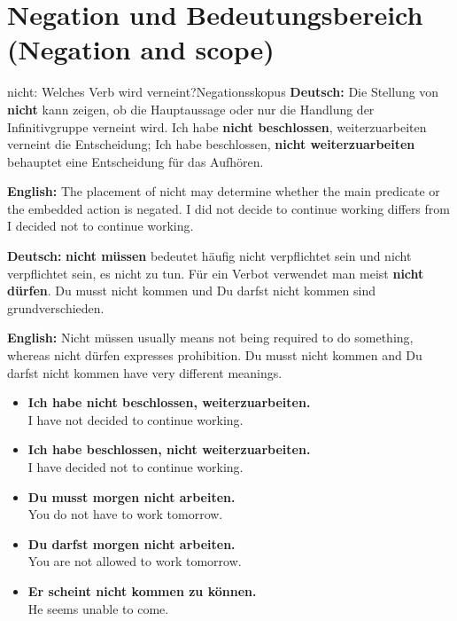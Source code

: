 \documentclass[a4paper,11pt]{article}
\newcommand{\GermanText}[1]{\textbf{Deutsch: }#1\par}
\newcommand{\EnglishText}[1]{{\small\color{SoftGray}\textbf{English: }#1\par}}
\newcommand{\ExampleItem}[2]{\item \textbf{#1}\\{\small\color{SoftGray}#2}}
\newcommand{\DEEN}[2]{\GermanText{#1}\EnglishText{#2}}
\newcommand{\Pair}[2]{\ExampleItem{#1}{#2}}
\begin{document}
\section{Negation und Bedeutungsbereich \textnormal{(Negation and scope)}}
\begin{grammarentry}{nicht: Welches Verb wird verneint?}{Negationsskopus}
\DEEN{Die Stellung von \textbf{nicht} kann zeigen, ob die Hauptaussage oder nur die Handlung der Infinitivgruppe verneint wird. \glqq Ich habe \textbf{nicht beschlossen}, weiterzuarbeiten\grqq{} verneint die Entscheidung; \glqq Ich habe beschlossen, \textbf{nicht weiterzuarbeiten}\grqq{} behauptet eine Entscheidung für das Aufhören.}{The placement of nicht may determine whether the main predicate or the embedded action is negated. I did not decide to continue working differs from I decided not to continue working.}
\DEEN{\textbf{nicht müssen} bedeutet häufig \glqq nicht verpflichtet sein\grqq{} und nicht \glqq verpflichtet sein, es nicht zu tun\grqq. Für ein Verbot verwendet man meist \textbf{nicht dürfen}. \glqq Du musst nicht kommen\grqq{} und \glqq Du darfst nicht kommen\grqq{} sind grundverschieden.}{Nicht müssen usually means not being required to do something, whereas nicht dürfen expresses prohibition. Du musst nicht kommen and Du darfst nicht kommen have very different meanings.}
\end{grammarentry}
\begin{exbox}\begin{itemize}
\Pair{Ich habe nicht beschlossen, weiterzuarbeiten.}{I have not decided to continue working.}
\Pair{Ich habe beschlossen, nicht weiterzuarbeiten.}{I have decided not to continue working.}
\Pair{Du musst morgen nicht arbeiten.}{You do not have to work tomorrow.}
\Pair{Du darfst morgen nicht arbeiten.}{You are not allowed to work tomorrow.}
\Pair{Er scheint nicht kommen zu können.}{He seems unable to come.}
\end{itemize}\end{exbox}
\end{document}
